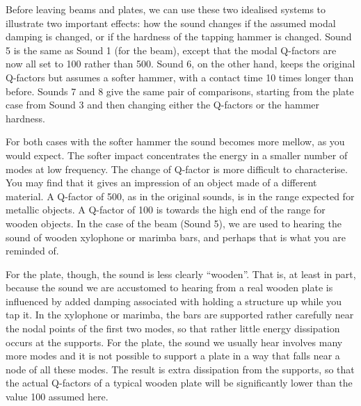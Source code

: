   Before leaving beams and plates, we can use these two idealised systems to 
  illustrate two important effects: how the sound changes if the assumed modal 
  damping is changed, or if the hardness of the tapping hammer is changed. 
  Sound 5 is the same as Sound 1 (for the beam), except that the modal 
  Q-factors are now all set to 100 rather than 500. Sound 6, on the other hand, 
  keeps the original Q-factors but assumes a softer hammer, with a contact time 
  10 times longer than before. Sounds 7 and 8 give the same pair of 
  comparisons, starting from the plate case from Sound 3 and then changing 
  either the Q-factors or the hammer hardness. 





  For both cases with the softer hammer the sound becomes more mellow, as you 
  would expect. The softer impact concentrates the energy in a smaller number 
  of modes at low frequency. The change of Q-factor is more difficult to 
  characterise. You may find that it gives an impression of an object made of a 
  different material. A Q-factor of 500, as in the original sounds, is in the 
  range expected for metallic objects. A Q-factor of 100 is towards the high 
  end of the range for wooden objects. In the case of the beam (Sound 5), we 
  are used to hearing the sound of wooden xylophone or marimba bars, and 
  perhaps that is what you are reminded of. 

  For the plate, though, the sound is less clearly ``wooden''. That is, at 
  least in part, because the sound we are accustomed to hearing from a real 
  wooden plate is influenced by added damping associated with holding a 
  structure up while you tap it. In the xylophone or marimba, the bars are 
  supported rather carefully near the nodal points of the first two modes, so 
  that rather little energy dissipation occurs at the supports. For the plate, 
  the sound we usually hear involves many more modes and it is not possible to 
  support a plate in a way that falls near a node of all these modes. The 
  result is extra dissipation from the supports, so that the actual Q-factors 
  of a typical wooden plate will be significantly lower than the value 100 
  assumed here. 

